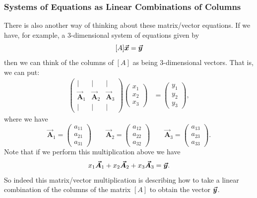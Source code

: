         \subsubsection{Systems of Equations as Linear Combinations of Columns}
        There is also another way of thinking about these matrix/vector equations.  If we have, for example, a 3-dimensional system of equations given by
        \[
        [A]\boldsymbol{\boldsymbol{\vec{x}}} = \boldsymbol{\boldsymbol{\vec{y}}}
        \]
        then we can think of the columns of $[A]$ as being 3-dimensional vectors. That is, we can put:
        \begin{align*}
            \begin{pmatrix} \vert & \vert & \vert \\ \boldsymbol{\vec{A}}_1 & \boldsymbol{\vec{A}}_2 & \boldsymbol{\vec{A}}_3 \\ \vert & \vert & \vert \end{pmatrix} \begin{pmatrix} x_1 \\ x_2 \\ x_3 \end{pmatrix} &= \begin{pmatrix} y_1 \\ y_2 \\ y_3 \end{pmatrix},
        \end{align*}
        where we have
        \[
            \boldsymbol{\vec{A}}_1 = \begin{pmatrix} a_{11} \\ a_{21} \\ a_{31} \end{pmatrix} \qquad \boldsymbol{\vec{A}}_2 = \begin{pmatrix} a_{12} \\ a_{22} \\ a_{32} \end{pmatrix} \qquad \boldsymbol{\vec{A}}_3 = \begin{pmatrix} a_{13} \\ a_{23} \\ a_{33} \end{pmatrix}.
        \]
        Note that if we perform this multiplication above we have
        \[
        x_1 \boldsymbol{\vec{A}}_1 +x_2 \boldsymbol{\vec{A}}_2  + x_3 \boldsymbol{\vec{A}}_3 = \boldsymbol{\boldsymbol{\vec{y}}}.
        \]
        So indeed this matrix/vector multiplication is describing how to take a linear combination of the columns of the matrix $[A]$ to obtain the vector $\boldsymbol{\boldsymbol{\vec{y}}}$.  
        
